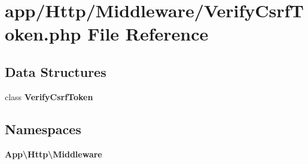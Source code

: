 \section{app/\+Http/\+Middleware/\+Verify\+Csrf\+Token.php File Reference}
\label{app_2_http_2_middleware_2_verify_csrf_token_8php}
\subsection*{Data Structures}
\begin{DoxyCompactItemize}
\item 
class {\bf Verify\+Csrf\+Token}
\end{DoxyCompactItemize}
\subsection*{Namespaces}
\begin{DoxyCompactItemize}
\item 
 {\bf App\textbackslash{}\+Http\textbackslash{}\+Middleware}
\end{DoxyCompactItemize}
